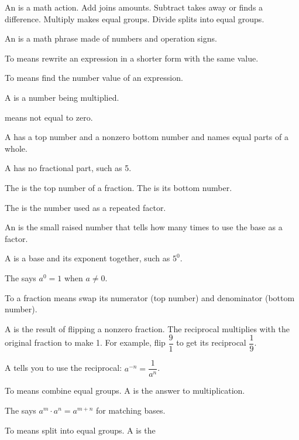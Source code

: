 \begin{words}
  \item An is a math action. Add joins amounts. Subtract takes
    away or finds a difference. Multiply makes equal groups. Divide splits into
    equal groups.
  \item An is a math phrase made of numbers and operation signs.
  \item To means rewrite an expression in a shorter form with the
    same value.
  \item To means find the number value of an expression.
  \item A is a number being multiplied.
  \item {}means not equal to zero.
  \item A has a top number and a nonzero bottom number and names
    equal parts of a whole.
  \item A has no fractional part, such as 5.
  \item The is the top number of a fraction. The
    is its bottom number.
  \item The is the number used as a repeated factor.
  \item An is the small raised number that tells how many times to
    use the base as a factor.
  \item A is a base and its exponent together, such as $5^{0}$.
  \item The says $a^{0} = 1$ when $a \neq 0$.
  \item To a fraction means swap its numerator (top number) and
    denominator (bottom number).
  \item A is the result of flipping a nonzero fraction. The
    reciprocal multiplies with the original fraction to make 1. For example, flip
    $\dfrac{9}{1}$ to get its reciprocal $\dfrac{1}{9}$.
  \item A tells you to use the reciprocal:
    $a^{-n} = \dfrac{1}{a^{n}}$.
  \item To means combine equal groups. A is the
    answer to multiplication.
  \item The says $a^{m} \cdot a^{n} = a^{m+n}$ for
    matching bases.
  \item To means split into equal groups. A is the

\end{words}
